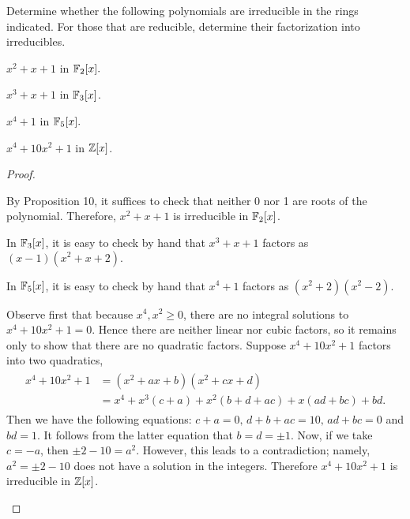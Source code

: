 \documentclass[10pt]{amsart}
\begin{document}
\begin{thm}
  \label{Ex1}
  Determine whether the following polynomials are irreducible in the rings indicated.  For those that are reducible, determine their factorization into irreducibles.
  \begin{alphaenum}
  \item 
    $x^2 + x + 1$ in $\mathbb{F}_2[x].$
  \item
    $x^3 + x + 1$ in $\mathbb{F}_3[x]$.
  \item
    $x^4 + 1$ in $\mathbb{F}_5[x].$
  \item
    $x^4 + 10x^2 + 1$ in $\mathbb{Z}[x]$.
  \end{alphaenum}
  
  \begin{proof}
    \begin{alphaenum}
    \item
      By Proposition 10, it suffices to check that neither 0 nor 1 are roots of the polynomial.  
      Therefore, $x^2 + x + 1$ is irreducible in $\mathbb{F}_2[x]$.
    \item
      In $\mathbb{F}_3[x]$, it is easy to check by hand that $x^3 + x + 1$ factors as $(x-1)(x^2 + x + 2).$
    \item
      In $\mathbb{F}_5[x]$, it is easy to check by hand that $x^4+1$ factors as $(x^2 + 2)(x^2-2)$.
    \item
      Observe first that because $x^4,x^2 \geq 0$, there are no integral solutions to $x^4 + 10x^2 + 1 = 0$.
      Hence there are neither linear nor cubic factors, so it remains only to show that there are no quadratic factors.
      Suppose $x^4 + 10x^2 + 1$ factors into two quadratics, 
      \begin{align*}
        \begin{split}
          x^4 + 10x^2 + 1 &= (x^2 + ax + b)(x^2 + cx + d)\\ &= x^4 + x^3(c+a)+x^2(b+d+ac) +x(ad+bc)+bd.
        \end{split}
      \end{align*}
      Then we have the following equations:  $c+a = 0,\, d+b+ac = 10,\, ad+bc=0$ and $bd = 1$.
      It follows from the latter equation that $b = d = \pm 1$.
      Now, if we take  $c = -a$, then $\pm 2 - 10 = a^2$.
      However, this leads to a contradiction; namely, $a^2 = \pm 2 - 10$ does not have a solution in the integers.
      Therefore $x^4 + 10x^2 + 1$ is irreducible in $\mathbb{Z}[x]$.
    \end{alphaenum}
  \end{proof}
\end{thm}
\end{document}
